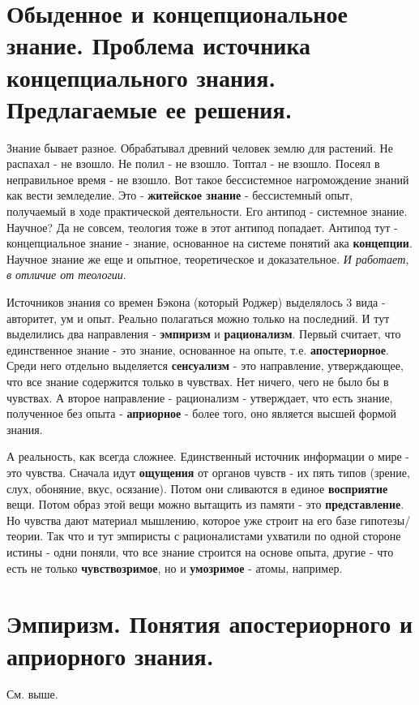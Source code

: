 \section{ Обыденное и концепциональное знание. Проблема источника концепциального знания. Предлагаемые ее решения.}
Знание бывает разное. Обрабатывал древний человек землю для растений. Не распахал - не взошло. Не полил - не взошло. Топтал - не взошло. Посеял в неправильное время - не взошло. Вот такое бессистемное нагромождение знаний как вести земледелие. Это - \textbf{житейское знание} - бессистемный опыт, получаемый в ходе практической деятельности. Его антипод - системное знание. Научное? Да не совсем, теология тоже в этот антипод попадает. Антипод тут - концепциальное знание - знание, основанное на системе понятий ака \textbf{концепции}. Научное знание же еще и опытное, теоретическое и доказательное. \textit{И работает, в отличие от теологии}.

Источников знания со времен Бэкона (который Роджер) выделялось 3 вида - авторитет, ум и опыт. Реально полагаться можно только на последний. И тут выделились два направления - \textbf{эмпиризм} и \textbf{рационализм}. Первый считает, что единственное знание - это знание, основанное на опыте, т.е. \textbf{апостериорное}. Среди него отдельно выделяется \textbf{сенсуализм} - это направление, утверждающее, что все знание содержится только в чувствах. Нет ничего, чего не было бы в чувствах. А второе направление - рационализм - утверждает, что есть знание, полученное без опыта - \textbf{априорное} - более того, оно является высшей формой знания.

А реальность, как всегда сложнее. Единственный источник информации о мире - это чувства. Сначала идут \textbf{ощущения} от органов чувств - их пять типов (зрение, слух, обоняние, вкус, осязание). Потом они сливаются в единое \textbf{восприятие} вещи. Потом образ этой вещи можно вытащить из памяти - это \textbf{представление}. Но чувства дают материал мышлению, которое уже строит на его базе гипотезы/теории. Так что и тут эмпиристы с рационалистами ухватили по одной стороне истины - одни поняли, что все знание строится на основе опыта, другие - что есть не только \textbf{чувствозримое}, но и \textbf{умозримое} - атомы, например.

\section{ Эмпиризм. Понятия апостериорного и априорного знания.}
См. выше.

